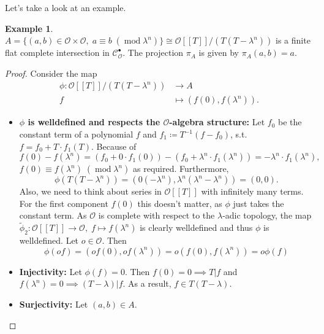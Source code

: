 \documentclass{article}
\theoremstyle{plain}%
\theoremstyle{definition}
\newtheorem{example}[theorem]{Example}
\theoremstyle{remark}
\newcommand{\cob}{\mathcal{C}_\mathcal{O}^\bullet}
\begin{document}
Let's take a look at an example.
\begin{example}\label{ex:first_1}\cite[cf.][example 1]{Darmon1995}
    \(A = \{(a,b) \in \mathcal{O}\times\mathcal{O},\; a \equiv b\; (\operatorname{mod} \lambda^n)\} 
    \cong \mathcal{O}[[T]]/(T(T-\lambda^n))\) is a finite flat complete intersection in \(\cob\).
    The projection \(\pi_A\) is given by \(\pi_A(a,b) = a\).
    \begin{proof}
        Consider the map
        \begin{align*}
            \phi\colon \mathcal{O}[[T]]/(T(T-\lambda^n)) &\to A\\
            f &\mapsto (f(0), f(\lambda^n)).
        \end{align*}
        \begin{itemize}
            \item \textbf{\(\phi\) is welldefined and respects the \(\mathcal{O}\)-algebra structure:}
                Let \(f_0\) be the constant term of a polynomial \(f\) and \(f_1 \coloneqq T^{-1}(f-f_0)\), 
                s.t. \(f = f_0 + T\cdot f_1(T)\). Because of
                \[
                    f(0) - f(\lambda^n) 
                    = (f_0 + 0\cdot f_1(0)) - (f_0 + \lambda^n \cdot f_1(\lambda^n)) 
                    = -\lambda^n \cdot f_1(\lambda^n),
                \]
                \(f(0) \equiv f(\lambda^n)\; (\operatorname{mod} \lambda^n)\) as required.
                Furthermore, \[\phi(T(T-\lambda^n)) = (0(-\lambda^n), \lambda^n(\lambda^n - \lambda^n)) = (0,0).\]
                Also, we need to think about series in \(\mathcal{O}[[T]]\) with infinitely many terms.
                For the first component \(f(0)\) this doesn't matter, as \(\phi\) just takes the constant term. 
                As \(\mathcal{O}\) is complete with respect to the \(\lambda\)-adic topology, 
                the map \(\tilde\phi_2\colon \mathcal{O}[[T]] \to \mathcal{O},\; f \mapsto f(\lambda^n)\) 
                is clearly welldefined and thus \(\phi\) is welldefined.
                Let \(o \in \mathcal{O}\). Then 
                \[\phi(of) = (of(0), of(\lambda^n)) = o(f(0), f(\lambda^n)) = o\phi(f)\]
            \item \textbf{Injectivity:}
                Let \(\phi(f) = 0\). Then \(f(0) = 0 \implies T | f\) and \(f(\lambda^n) = 0 \implies (T - \lambda) | f\).
                As a result, \(f \in T(T-\lambda)\).
            \item \textbf{Surjectivity:}
                Let \((a,b) \in A\).

\end{itemize}
\end{proof}
\end{example}
\end{document}
